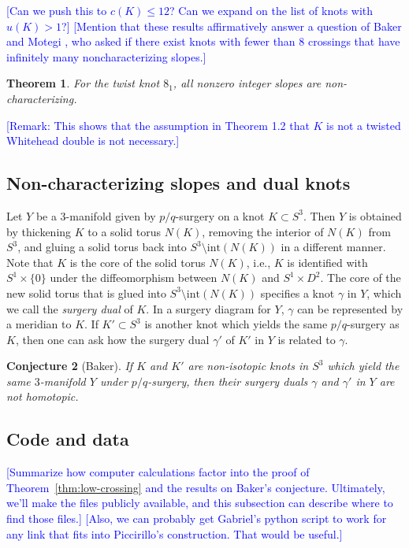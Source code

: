 \documentclass[11pt,usenames,dvipsnames,reqno]{amsart}
\newtheorem{theorem}{Theorem}
\numberwithin{theorem}{section}
\newtheorem{conjecture}[theorem]{Conjecture}
\theoremstyle{ex}
\theoremstyle{rem}
\def\kh#1{\textcolor{Blue}{#1}}
\begin{document}
\kh{[Can we push this to $c(K)\leq 12$? Can we expand on the list of knots with $u(K)>1$?]} 
\kh{[Mention that these results affirmatively answer a question of Baker and Motegi \cite[Question~1.7]{baker-motegi}, who asked if there exist knots with fewer than 8 crossings that have infinitely many noncharacterizing slopes.]}


\begin{theorem}\label{thm:twist} For the twist knot $8_1$, all nonzero integer slopes are non-characterizing.
\end{theorem}

\kh{[Remark: This shows that the assumption in Theorem 1.2 that $K$ is not a twisted Whitehead double is not necessary.]}






\subsection{Non-characterizing slopes and dual knots} Let $Y$ be a 3-manifold given by $p/q$-surgery on a knot $K\subset S^3$. Then $Y$ is obtained by thickening $K$ to a solid torus $N(K)$, removing the interior of $N(K)$ from $S^3$, and gluing a solid torus back into $S^3\setminus\mathrm{int}(N(K))$ in a different manner. Note that $K$ is the core of the solid torus $N(K)$, i.e., $K$ is identified with $S^1\times\{0\}$ under the diffeomorphism between $N(K)$ and $S^1\times D^2$. The core of the new solid torus that is glued into $S^3\setminus\mathrm{int}(N(K))$ specifies a knot $\gamma$ in $Y$, which we call the \textit{surgery dual} of $K$. In a surgery diagram for $Y$, $\gamma$ can be represented by a meridian to $K$. If $K'\subset S^3$ is another knot which yields the same $p/q$-surgery as $K$, then one can ask how the surgery dual $\gamma'$ of $K'$ in $Y$ is related to $\gamma$. 

\begin{conjecture}[Baker] If $K$ and $K'$ are non-isotopic knots in $S^3$ which yield the same $3$-manifold $Y$ under $p/q$-surgery, then their surgery duals $\gamma$ and $\gamma'$ in $Y$ are not homotopic.
\end{conjecture}

\subsection{Code and data} \kh{[Summarize how computer calculations factor into the proof of Theorem~\ref{thm:low-crossing} and the results on Baker's conjecture. Ultimately, we'll make the files publicly available, and this subsection can describe where to find those files.]} \kh{[Also, we can probably get Gabriel's python script to work for any link that fits into Piccirillo's construction. That would be useful.]}
\end{document}
